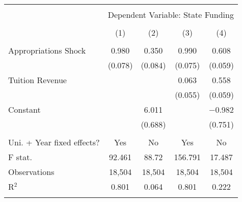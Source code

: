 
\begin{tabular}{@{\extracolsep{5pt}}lcccc} 
\\[-1.8ex]\hline 
\hline \\[-1.8ex] 
 & \multicolumn{4}{c}{Dependent Variable: State Funding} \\ 
\cline{2-5} 
\\[-1.8ex] & (1) & (2) & (3) & (4)\\ 
\hline \\[-1.8ex] 
 Appropriations Shock & 0.980 & 0.350 & 0.990 & 0.608 \\ 
  & (0.078) & (0.084) & (0.075) & (0.059) \\ 
  Tuition Revenue &  &  & 0.063 & 0.558 \\ 
  &  &  & (0.055) & (0.059) \\ 
  Constant &  & 6.011 &  & $-$0.982 \\ 
  &  & (0.688) &  & (0.751) \\ 
 \hline \\[-1.8ex] 
Uni. + Year fixed effects? & Yes & No & Yes & No \\ 
F stat. & 92.461 & 88.72 & 156.791 & 17.487 \\ 
Observations & 18,504 & 18,504 & 18,504 & 18,504 \\ 
R$^{2}$ & 0.801 & 0.064 & 0.801 & 0.222 \\ 
\hline 
\hline \\[-1.8ex] 
\end{tabular} 
